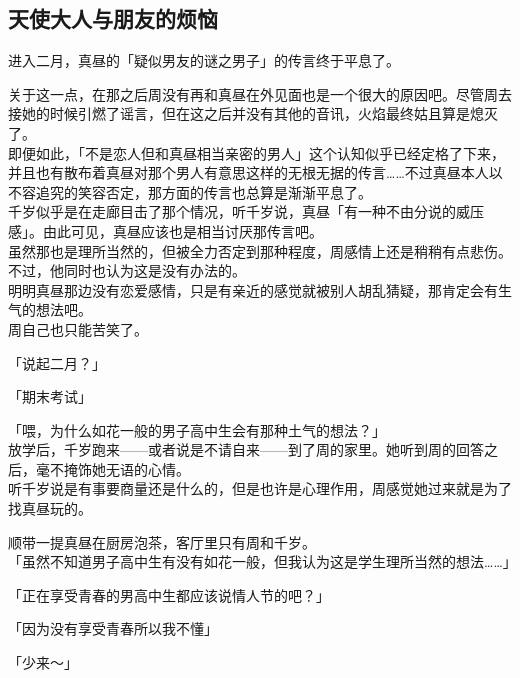 \subsection{天使大人与朋友的烦恼}

进入二月，真昼的「疑似男友的谜之男子」的传言终于平息了。

关于这一点，在那之后周没有再和真昼在外见面也是一个很大的原因吧。尽管周去接她的时候引燃了谣言，但在这之后并没有其他的音讯，火焰最终姑且算是熄灭了。\\

即便如此，「不是恋人但和真昼相当亲密的男人」这个认知似乎已经定格了下来，并且也有散布着真昼对那个男人有意思这样的无根无据的传言……不过真昼本人以不容追究的笑容否定，那方面的传言也总算是渐渐平息了。\\

千岁似乎是在走廊目击了那个情况，听千岁说，真昼「有一种不由分说的威压感」。由此可见，真昼应该也是相当讨厌那传言吧。\\

虽然那也是理所当然的，但被全力否定到那种程度，周感情上还是稍稍有点悲伤。不过，他同时也认为这是没有办法的。\\

明明真昼那边没有恋爱感情，只是有亲近的感觉就被别人胡乱猜疑，那肯定会有生气的想法吧。\\

周自己也只能苦笑了。\\

\vspace{2\baselineskip}

「说起二月？」

「期末考试」

「喂，为什么如花一般的男子高中生会有那种土气的想法？」\\

放学后，千岁跑来——或者说是不请自来——到了周的家里。她听到周的回答之后，毫不掩饰她无语的心情。\\

听千岁说是有事要商量还是什么的，但是也许是心理作用，周感觉她过来就是为了找真昼玩的。

顺带一提真昼在厨房泡茶，客厅里只有周和千岁。\\

「虽然不知道男子高中生有没有如花一般，但我认为这是学生理所当然的想法……」

「正在享受青春的男高中生都应该说情人节的吧？」

「因为没有享受青春所以我不懂」

「少来～」\\


